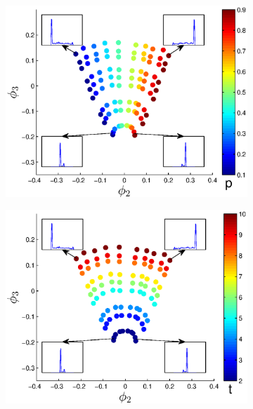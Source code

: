 \documentclass[prl, reprint, final, showkeys]{revtex4-1}
\begin{document}
\begin{figure}[t]
\begin{subfigure}{0.45\columnwidth}
\includegraphics[width=\textwidth]{EMD2_withhist_p_10}
\caption{}
\end{subfigure}
\begin{subfigure}{0.45\columnwidth}
\includegraphics[width=\textwidth]{EMD2_withhist_t_10}
\caption{}
\end{subfigure}
\begin{subfigure}{0.45\columnwidth}

\end{subfigure}
\end{figure}
\end{document}
